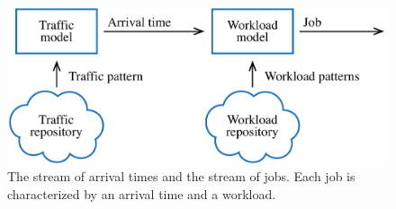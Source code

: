 \begin{figure}
  \centering
  \includegraphics[width=1.0\columnwidth]{include/assets/figures/streams.pdf}
  \caption{The stream of arrival times and the stream of jobs. Each job is
  characterized by an arrival time and a workload.}
\end{figure}
